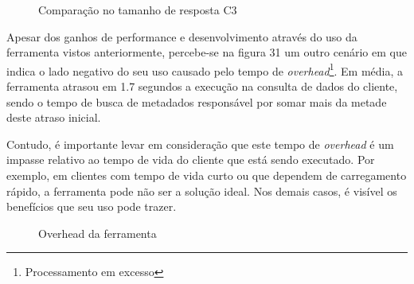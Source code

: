 \begin{figure}[H]
  \centering
  \caption{Comparação no tamanho de resposta C3}
\end{figure}

Apesar dos ganhos de performance e desenvolvimento através do uso da ferramenta vistos anteriormente, percebe-se na figura 31 um outro cenário em que indica o lado negativo do seu uso causado pelo tempo de \textit{overhead}\footnote{
  Processamento em excesso
}. Em média, a ferramenta atrasou em 1.7 segundos a execução na consulta de dados do cliente, sendo o tempo de busca de metadados responsável por somar mais da metade deste atraso inicial.

Contudo, é importante levar em consideração que este tempo de \textit{overhead} é um impasse relativo ao tempo de vida do cliente que está sendo executado. Por exemplo, em clientes com tempo de vida curto ou que dependem de carregamento rápido, a ferramenta pode não ser a solução ideal. Nos demais casos, é visível os benefícios que seu uso pode trazer.

\begin{figure}[H]
  \centering
  \caption{Overhead da ferramenta}
\end{figure}
